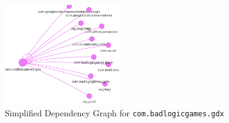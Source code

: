 \begin{figure}
  \centering
    \includegraphics[width=0.45\textwidth]{media/network-sample.png}
    \caption{Simplified Dependency Graph for \texttt{com.badlogicgames.gdx}}
\end{figure}